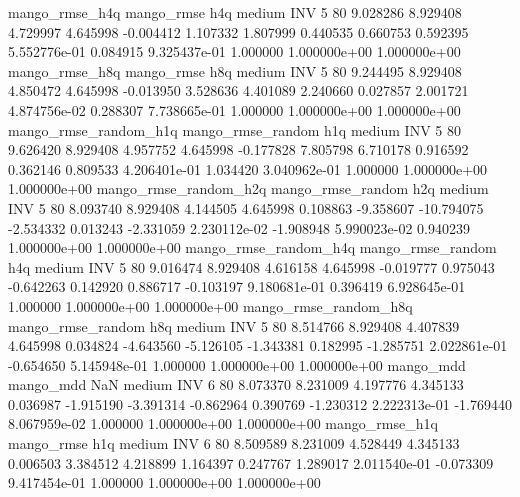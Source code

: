        mango_rmse_h4q        mango_rmse                  h4q     medium      INV                 5 80  9.028286       8.929408 4.729997       4.645998   -0.004412      1.107332      1.807999     0.440535       0.660753  0.592395 5.552776e-01     0.084915   9.325437e-01            1.000000    1.000000e+00        1.000000e+00
       mango_rmse_h8q        mango_rmse                  h8q     medium      INV                 5 80  9.244495       8.929408 4.850472       4.645998   -0.013950      3.528636      4.401089     2.240660       0.027857  2.001721 4.874756e-02     0.288307   7.738665e-01            1.000000    1.000000e+00        1.000000e+00
mango_rmse_random_h1q mango_rmse_random                  h1q     medium      INV                 5 80  9.626420       8.929408 4.957752       4.645998   -0.177828      7.805798      6.710178     0.916592       0.362146  0.809533 4.206401e-01     1.034420   3.040962e-01            1.000000    1.000000e+00        1.000000e+00
mango_rmse_random_h2q mango_rmse_random                  h2q     medium      INV                 5 80  8.093740       8.929408 4.144505       4.645998    0.108863     -9.358607    -10.794075    -2.534332       0.013243 -2.331059 2.230112e-02    -1.908948   5.990023e-02            0.940239    1.000000e+00        1.000000e+00
mango_rmse_random_h4q mango_rmse_random                  h4q     medium      INV                 5 80  9.016474       8.929408 4.616158       4.645998   -0.019777      0.975043     -0.642263     0.142920       0.886717 -0.103197 9.180681e-01     0.396419   6.928645e-01            1.000000    1.000000e+00        1.000000e+00
mango_rmse_random_h8q mango_rmse_random                  h8q     medium      INV                 5 80  8.514766       8.929408 4.407839       4.645998    0.034824     -4.643560     -5.126105    -1.343381       0.182995 -1.285751 2.022861e-01    -0.654650   5.145948e-01            1.000000    1.000000e+00        1.000000e+00
            mango_mdd         mango_mdd                  NaN     medium      INV                 6 80  8.073370       8.231009 4.197776       4.345133    0.036987     -1.915190     -3.391314    -0.862964       0.390769 -1.230312 2.222313e-01    -1.769440   8.067959e-02            1.000000    1.000000e+00        1.000000e+00
       mango_rmse_h1q        mango_rmse                  h1q     medium      INV                 6 80  8.509589       8.231009 4.528449       4.345133    0.006503      3.384512      4.218899     1.164397       0.247767  1.289017 2.011540e-01    -0.073309   9.417454e-01            1.000000    1.000000e+00        1.000000e+00

